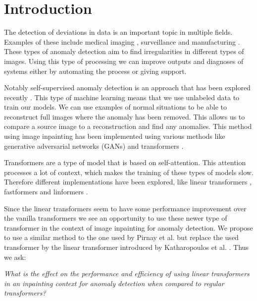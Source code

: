 \chapter{Introduction}\label{ch:introduction}

The detection of deviations in data is an important topic in multiple fields. Examples of these include medical imaging \cite{han_madgan_2021}, surveillance \cite{shashikar_traffic_2017} and manufacturing \cite{susto_anomaly_2017}. These types of anomaly detection aim to find irregularities in different types of images. Using this type of processing we can improve outputs and diagnoses of systems either by automating the process or giving support.

Notably self-supervised anomaly detection is an approach that has been explored recently \cite{li_cutpaste_2021, ali_self-supervised_2020}. This type of machine learning means that we use unlabeled data to train our models. We can use examples of normal situations to be able to reconstruct full images where the anomaly has been removed. This allows us to compare a source image to a reconstruction and find any anomalies. This method using image inpainting has been implemented using various methods like generative adversarial networks (GANs) \cite{yeh_semantic_2017} and transformers \cite{pirnay_inpainting_2021}.

Transformers \cite{vaswani_attention_2017} are a type of model that is based on self-attention. This attention processes a lot of context, which makes the training of these types of models slow. Therefore different implementations have been explored, like linear transformers \cite{katharopoulos_transformers_2020}, fastformers \cite{wu_fastformer_2021} and linformers \cite{wang_linformer_2020}.

Since the linear transformers seem to have some performance improvement over the vanilla transformers we see an opportunity to use these newer type of transformer in the context of image inpainting for anomaly detection. We propose to use a similar method to the one used by Pirnay et al. \cite{pirnay_inpainting_2021} but replace the used transformer by the linear transformer introduced by Katharopoulos et al. \cite{katharopoulos_transformers_2020}. Thus we ask:

\textit{What is the effect on the performance and efficiency of using linear transformers in an inpainting context for anomaly detection when compared to regular transformers?}

